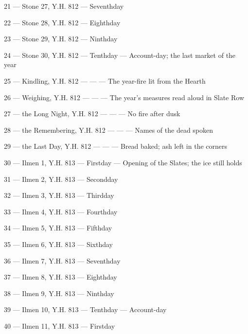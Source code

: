 \documentclass{design/chronicle}
\begin{document}
21 — Stone 27, Y.H. 812 — Seventhday\par

22 — Stone 28, Y.H. 812 — Eighthday\par

23 — Stone 29, Y.H. 812 — Ninthday\par

24 — Stone 30, Y.H. 812 — Tenthday — Account-day; the last market of the year\par

25 — Kindling, Y.H. 812 — — — The year-fire lit from the Hearth\par

26 — Weighing, Y.H. 812 — — — The year’s measures read aloud in Slate Row\par

27 — the Long Night, Y.H. 812 — — — No fire after dusk\par

28 — the Remembering, Y.H. 812 — — — Names of the dead spoken\par

29 — the Last Day, Y.H. 812 — — — Bread baked; ash left in the corners\par

30 — Ilmen 1, Y.H. 813 — Firstday — Opening of the Slates; the ice still holds\par

31 — Ilmen 2, Y.H. 813 — Secondday\par

32 — Ilmen 3, Y.H. 813 — Thirdday\par

33 — Ilmen 4, Y.H. 813 — Fourthday\par

34 — Ilmen 5, Y.H. 813 — Fifthday\par

35 — Ilmen 6, Y.H. 813 — Sixthday\par

36 — Ilmen 7, Y.H. 813 — Seventhday\par

37 — Ilmen 8, Y.H. 813 — Eighthday\par

38 — Ilmen 9, Y.H. 813 — Ninthday\par

39 — Ilmen 10, Y.H. 813 — Tenthday — Account-day\par

40 — Ilmen 11, Y.H. 813 — Firstday\par
\end{document}

